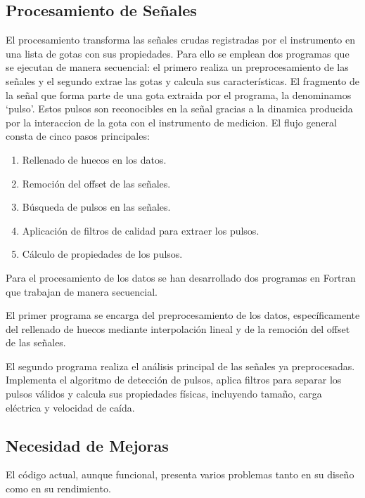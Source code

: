\documentclass[12pt,a4paper]{article}
\begin{document}
\subsection{Procesamiento de Señales}
\lhead{}

El procesamiento transforma las señales crudas registradas por el instrumento en una lista de gotas con sus propiedades. Para ello se emplean dos programas que se ejecutan de manera secuencial: el primero realiza un preprocesamiento de las señales y el segundo extrae las gotas y calcula sus características.
El fragmento de la señal que forma parte de una gota extraida por el programa, la denominamos `pulso'. Estos pulsos son reconocibles en la señal gracias a la dinamica producida por la interaccion de la gota con el instrumento de medicion.
El flujo general consta de cinco pasos principales:

\begin{enumerate}
    \item Rellenado de huecos en los datos.
    \item Remoción del offset de las señales.
    \item Búsqueda de pulsos en las señales.
    \item Aplicación de filtros de calidad para extraer los pulsos.
    \item Cálculo de propiedades de los pulsos.
\end{enumerate}

Para el procesamiento de los datos se han desarrollado dos programas en Fortran que trabajan de manera secuencial.

El primer programa se encarga del preprocesamiento de los datos, específicamente del rellenado de huecos mediante interpolación lineal y de la remoción del offset de las señales.

El segundo programa realiza el análisis principal de las señales ya preprocesadas. Implementa el algoritmo de detección de pulsos, aplica filtros para separar los pulsos válidos y calcula sus propiedades físicas, incluyendo tamaño, carga eléctrica y velocidad de caída.

\subsection{Necesidad de Mejoras}
\lhead{}

El código actual, aunque funcional, presenta varios problemas tanto en su diseño como en su rendimiento.
\end{document}
